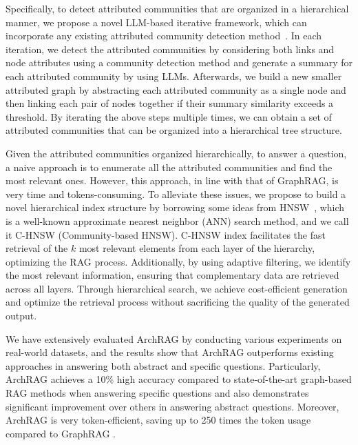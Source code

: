 Specifically, to detect attributed communities that are organized in a hierarchical manner, we propose a novel LLM-based iterative framework, which can incorporate any existing attributed community detection method~\cite{zhou2009graph,traag2019louvain,von2007tutorial,xu2007scan,grover2016node2vec}.
%
In each iteration, we detect the attributed communities by considering both links and node attributes using a community detection method and generate a summary for each attributed community by using LLMs.
%
Afterwards, we build a new smaller attributed graph by abstracting each attributed community as a single node and then linking each pair of nodes together if their summary similarity exceeds a threshold.
%
By iterating the above steps multiple times, we can obtain a set of attributed communities that can be organized into a hierarchical tree structure.

Given the attributed communities organized hierarchically, to answer a question, a naive approach is to enumerate all the attributed communities and find the most relevant ones.
%
However, this approach, in line with that of GraphRAG, is very time and tokens-consuming.
%
To alleviate these issues, we propose to build a novel hierarchical index structure by borrowing some ideas from HNSW~\cite{malkov2018efficient}, which is a well-known approximate nearest neighbor (ANN) search method, and we call it C-HNSW (Community-based HNSW).
% 
C-HNSW index facilitates the fast retrieval of the $k$ most relevant elements from each layer of the hierarchy, optimizing the RAG process.
% 
Additionally, by using adaptive filtering, we identify the most relevant information, ensuring that complementary data are retrieved across all layers.
% 
Through hierarchical search, we achieve cost-efficient generation and optimize the retrieval process without sacrificing the quality of the generated output.

We have extensively evaluated ArchRAG by conducting various experiments on real-world datasets, and the results show that ArchRAG outperforms existing approaches in answering both abstract and specific questions.
% 
Particularly, ArchRAG achieves a 10\% high accuracy compared to state-of-the-art graph-based RAG methods when answering specific questions and also demonstrates significant improvement over others in answering abstract questions.
%
Moreover, ArchRAG is very token-efficient, saving up to 250 times the token usage compared to GraphRAG \cite{edge2024local}.

